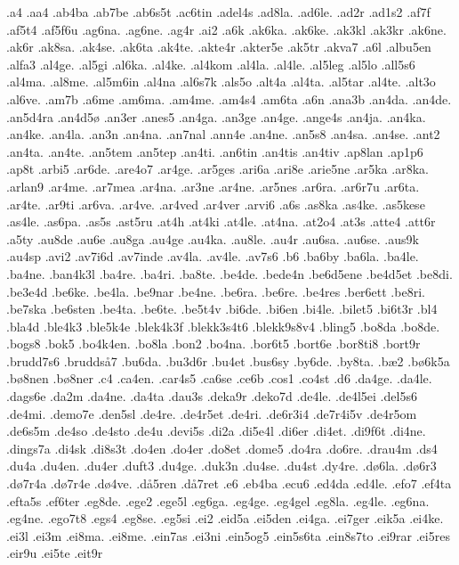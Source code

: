 .a4
.aa4
.ab4ba
.ab7be
.ab6s5t
.ac6tin
.adel4s
.ad8la.
.ad6le.
.ad2r
.ad1s2
.af7f
.af5t4
.af5f6u
.ag6na.
.ag6ne.
.ag4r
.ai2
.a6k
.ak6ka.
.ak6ke.
.ak3kl
.ak3kr
.ak6ne.
.ak6r
.ak8sa.
.ak4se.
.ak6ta
.ak4te.
.akte4r
.akter5e
.ak5tr
.akva7
.a6l
.albu5en
.alfa3
.al4ge.
.al5gi
.al6ka.
.al4ke.
.al4kom
.al4la.
.al4le.
.al5leg
.al5lo
.all5s6
.al4ma.
.al8me.
.al5m6in
.al4na
.al6s7k
.als5o
.alt4a
.al4ta.
.al5tar
.al4te.
.alt3o
.al6ve.
.am7b
.a6me
.am6ma.
.am4me.
.am4s4
.am6ta
.a6n
.ana3b
.an4da.
.an4de.
.an5d4ra
.an4d5^^f8
.an3er
.anes5
.an4ga.
.an3ge
.an4ge.
.ange4s
.an4ja.
.an4ka.
.an4ke.
.an4la.
.an3n
.an4na.
.an7nal
.ann4e
.an4ne.
.an5s8
.an4sa.
.an4se.
.ant2
.an4ta.
.an4te.
.an5tem
.an5tep
.an4ti.
.an6tin
.an4tis
.an4tiv
.ap8lan
.ap1p6
.ap8t
.arbi5
.ar6de.
.are4o7
.ar4ge.
.ar5ges
.ari6a
.ari8e
.arie5ne
.ar5ka
.ar8ka.
.arlan9
.ar4me.
.ar7mea
.ar4na.
.ar3ne
.ar4ne.
.ar5nes
.ar6ra.
.ar6r7u
.ar6ta.
.ar4te.
.ar9ti
.ar6va.
.ar4ve.
.ar4ved
.ar4ver
.arvi6
.a6s
.as8ka
.as4ke.
.as5kese
.as4le.
.as6pa.
.as5s
.ast5ru
.at4h
.at4ki
.at4le.
.at4na.
.at2o4
.at3s
.atte4
.att6r
.a5ty
.au8de
.au6e
.au8ga
.au4ge
.au4ka.
.au8le.
.au4r
.au6sa.
.au6se.
.aus9k
.au4sp
.avi2
.av7i6d
.av7inde
.av4la.
.av4le.
.av7s6
.b6
.ba6by
.ba6la.
.ba4le.
.ba4ne.
.ban4k3l
.ba4re.
.ba4ri.
.ba8te.
.be4de.
.bede4n
.be6d5ene
.be4d5et
.be8di.
.be3e4d
.be6ke.
.be4la.
.be9nar
.be4ne.
.be6ra.
.be6re.
.be4res
.ber6ett
.be8ri.
.be7ska
.be6sten
.be4ta.
.be6te.
.be5t4v
.bi6de.
.bi6en
.bi4le.
.bilet5
.bi6t3r
.bl4
.bla4d
.ble4k3
.ble5k4e
.blek4k3f
.blekk3s4t6
.blekk9s8v4
.bling5
.bo8da
.bo8de.
.bogs8
.bok5
.bo4k4en.
.bo8la
.bon2
.bo4na.
.bor6t5
.bort6e
.bor8ti8
.bort9r
.brudd7s6
.brudds^^e57
.bu6da.
.bu3d6r
.bu4et
.bus6sy
.by6de.
.by8ta.
.b^^e62
.b^^f86k5a
.b^^f88nen
.b^^f88ner
.c4
.ca4en.
.car4s5
.ca6se
.ce6b
.cos1
.co4st
.d6
.da4ge.
.da4le.
.dags6e
.da2m
.da4ne.
.da4ta
.dau3s
.deka9r
.deko7d
.de4le.
.de4l5ei
.del5s6
.de4mi.
.demo7e
.den5sl
.de4re.
.de4r5et
.de4ri. 
.de6r3i4
.de7r4i5v
.de4r5om
.de6s5m
.de4so
.de4sto
.de4u
.devi5s
.di2a
.di5e4l
.di6er
.di4et.
.di9f6t
.di4ne.
.dings7a
.di4sk
.di8s3t
.do4en
.do4er
.do8et
.dome5
.do4ra
.do6re.
.drau4m
.ds4
.du4a
.du4en.
.du4er
.duft3
.du4ge.
.duk3n
.du4se.
.du4st
.dy4re.
.d^^f86la.
.d^^f86r3
.d^^f87r4a
.d^^f87r4e
.d^^f84ve.
.d^^e55ren
.d^^e57ret
.e6
.eb4ba
.ecu6
.ed4da
.ed4le.
.efo7
.ef4ta
.efta5s
.ef6ter
.eg8de.
.ege2
.ege5l
.eg6ga.
.eg4ge.
.eg4gel
.eg8la.
.eg4le.
.eg6na.
.eg4ne.
.ego7t8
.egs4
.eg8se.
.eg5si
.ei2
.eid5a
.ei5den
.ei4ga.
.ei7ger
.eik5a
.ei4ke.
.ei3l
.ei3m
.ei8ma.
.ei8me.
.ein7as
.ei3ni
.ein5og5
.ein5s6ta
.ein8s7to
.ei9rar
.ei5res
.eir9u 
.ei5te
.eit9r
